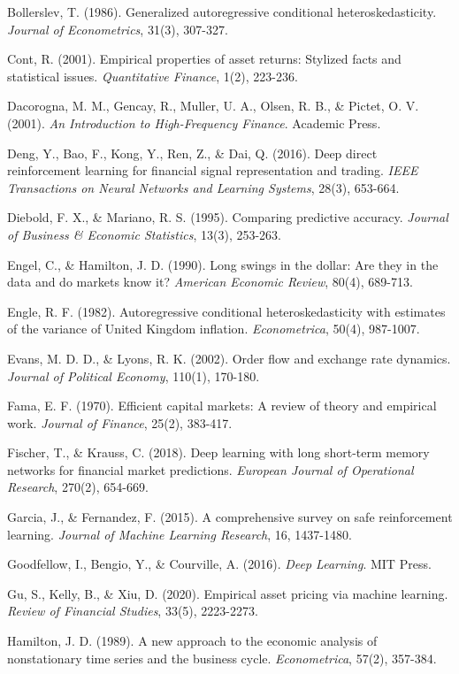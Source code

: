 \documentclass[12pt,a4paper]{article}
\begin{document}
Bollerslev, T. (1986). Generalized autoregressive conditional heteroskedasticity. \textit{Journal of Econometrics}, 31(3), 307-327.

Cont, R. (2001). Empirical properties of asset returns: Stylized facts and statistical issues. \textit{Quantitative Finance}, 1(2), 223-236.

Dacorogna, M. M., Gencay, R., Muller, U. A., Olsen, R. B., \& Pictet, O. V. (2001). \textit{An Introduction to High-Frequency Finance}. Academic Press.

Deng, Y., Bao, F., Kong, Y., Ren, Z., \& Dai, Q. (2016). Deep direct reinforcement learning for financial signal representation and trading. \textit{IEEE Transactions on Neural Networks and Learning Systems}, 28(3), 653-664.

Diebold, F. X., \& Mariano, R. S. (1995). Comparing predictive accuracy. \textit{Journal of Business \& Economic Statistics}, 13(3), 253-263.

Engel, C., \& Hamilton, J. D. (1990). Long swings in the dollar: Are they in the data and do markets know it? \textit{American Economic Review}, 80(4), 689-713.

Engle, R. F. (1982). Autoregressive conditional heteroskedasticity with estimates of the variance of United Kingdom inflation. \textit{Econometrica}, 50(4), 987-1007.

Evans, M. D. D., \& Lyons, R. K. (2002). Order flow and exchange rate dynamics. \textit{Journal of Political Economy}, 110(1), 170-180.

Fama, E. F. (1970). Efficient capital markets: A review of theory and empirical work. \textit{Journal of Finance}, 25(2), 383-417.

Fischer, T., \& Krauss, C. (2018). Deep learning with long short-term memory networks for financial market predictions. \textit{European Journal of Operational Research}, 270(2), 654-669.

Garcia, J., \& Fernandez, F. (2015). A comprehensive survey on safe reinforcement learning. \textit{Journal of Machine Learning Research}, 16, 1437-1480.

Goodfellow, I., Bengio, Y., \& Courville, A. (2016). \textit{Deep Learning}. MIT Press.

Gu, S., Kelly, B., \& Xiu, D. (2020). Empirical asset pricing via machine learning. \textit{Review of Financial Studies}, 33(5), 2223-2273.

Hamilton, J. D. (1989). A new approach to the economic analysis of nonstationary time series and the business cycle. \textit{Econometrica}, 57(2), 357-384.
\end{document}
